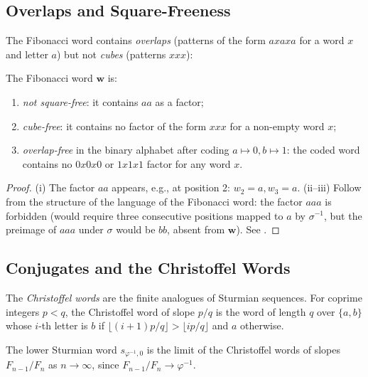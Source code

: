 \subsection{Overlaps and Square-Freeness}
\label{subsec:ch19-overlap}

The Fibonacci word contains \emph{overlaps} (patterns of the form
\(axaxa\) for a word \(x\) and letter \(a\)) but not \emph{cubes}
(patterns \(xxx\)):

\begin{proposition}%
  \label{prop:overlap-free}
  The Fibonacci word \(\mathbf{w}\) is:
  \begin{enumerate}[label=(\roman*)]
    \item \emph{not square-free}: it contains \(aa\) as a factor;
    \item \emph{cube-free}: it contains no factor of the form \(xxx\)
      for a non-empty word \(x\);
    \item \emph{overlap-free} in the binary alphabet after coding
      \(a\mapsto 0, b\mapsto 1\): the coded word contains no
      \(0x0x0\) or \(1x1x1\) factor for any word \(x\).
  \end{enumerate}
\end{proposition}
\begin{proof}
  (i) The factor \(aa\) appears, e.g., at position 2: \(w_2=a,w_3=a\).
  (ii--iii) Follow from the structure of the language of the Fibonacci
  word: the factor \(aaa\) is forbidden (would require three
  consecutive positions mapped to \(a\) by \(\sigma^{-1}\), but the
  preimage of \(aaa\) under \(\sigma\) would be \(bb\), absent from
  \(\mathbf{w}\)).  See \cite[\S2.2]{lothaire2002algebraic}.
\end{proof}

\subsection{Conjugates and the Christoffel Words}
\label{subsec:ch19-christoffel}

The \emph{Christoffel words} are the finite analogues of Sturmian
sequences.  For coprime integers \(p<q\), the Christoffel word of
slope \(p/q\) is the word of length \(q\) over \(\{a,b\}\) whose
\(i\)-th letter is \(b\) if
\(\lfloor (i+1)p/q \rfloor > \lfloor ip/q \rfloor\) and \(a\)
otherwise.

\begin{proposition}%
  \label{prop:christoffel}
  The lower Sturmian word \(s_{\varphi^{-1},0}\) is the limit of
  the Christoffel words of slopes \(F_{n-1}/F_n\) as
  \(n\to\infty\), since \(F_{n-1}/F_n\to\varphi^{-1}\).
\end{proposition}

